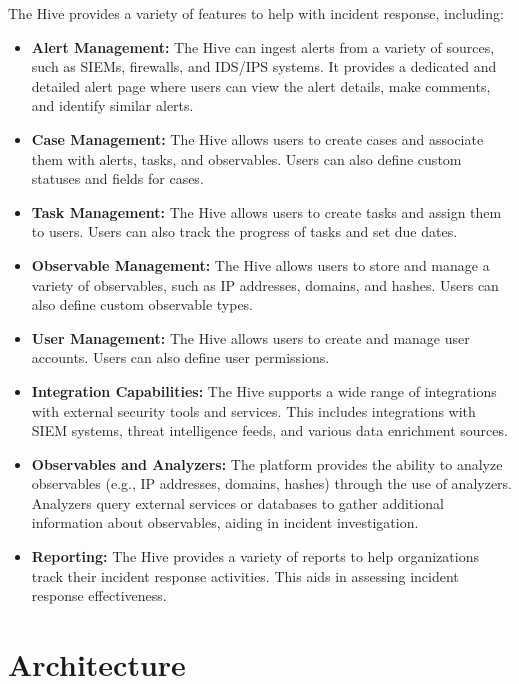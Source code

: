 \documentclass{book}
\begin{document}
The Hive provides a variety of features to help with incident response, including:

\begin{itemize}
  \item \textbf{Alert Management:} The Hive can ingest alerts from a variety of sources, such as SIEMs, firewalls, and IDS/IPS systems. It provides a dedicated and detailed alert page where users can view the alert details, make comments, and identify similar alerts.

  \item \textbf{Case Management:} The Hive allows users to create cases and associate them with alerts, tasks, and observables. Users can also define custom statuses and fields for cases.

  \item \textbf{Task Management:} The Hive allows users to create tasks and assign them to users. Users can also track the progress of tasks and set due dates.

  \item \textbf{Observable Management:} The Hive allows users to store and manage a variety of observables, such as IP addresses, domains, and hashes. Users can also define custom observable types.

  \item \textbf{User Management:} The Hive allows users to create and manage user accounts. Users can also define user permissions.

  \item \textbf{Integration Capabilities:} The Hive supports a wide range of integrations with external security tools and services. This includes integrations with SIEM systems, threat intelligence feeds, and various data enrichment sources.

  \item \textbf{Observables and Analyzers:} The platform provides the ability to analyze observables (e.g., IP addresses, domains, hashes) through the use of analyzers. Analyzers query external services or databases to gather additional information about observables, aiding in incident investigation.

  \item \textbf{Reporting:} The Hive provides a variety of reports to help organizations track their incident response activities. This aids in assessing incident response effectiveness.
\end{itemize}

\chapter{Architecture}
\end{document}
